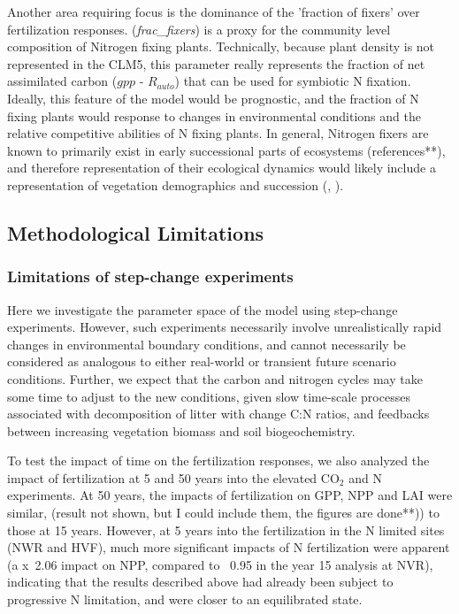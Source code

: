 \documentclass[draft,linenumbers]{agujournal}
\begin{document}
Another area requiring focus is the dominance of the 'fraction of fixers' over fertilization responses.  (\emph{frac\_fixers}) is a proxy for the community level composition of Nitrogen fixing plants. Technically, because plant density is not represented in the CLM5, this parameter really represents the fraction of net assimilated carbon ($gpp$ - $R_{auto}$) that can be used for symbiotic N fixation. Ideally, this feature of the model would be prognostic, and the fraction of N fixing plants would response to changes in environmental conditions and the relative competitive abilities of N fixing plants. In general, Nitrogen fixers are known to primarily exist in early successional parts of ecosystems (references**), and therefore representation of their ecological dynamics would likely include a representation of vegetation demographics and succession (\cite{fisher2018vegetation}, \cite{trugman2016climate}).

\subsection{ Methodological Limitations}
\subsubsection{Limitations of step-change experiments}
Here we investigate the parameter space of the model using step-change experiments. However, such experiments necessarily involve unrealistically rapid changes in environmental boundary conditions, and cannot necessarily be considered as analogous to either real-world or transient future scenario conditions. Further, we expect that the carbon and nitrogen cycles may take some time to adjust to the new conditions, given slow time-scale processes associated with decomposition of litter with change C:N ratios, and feedbacks between increasing vegetation biomass and soil biogeochemistry.

To test the impact of time on the fertilization responses, we also analyzed the impact of fertilization at 5 and 50 years into the elevated CO$_{2}$ and N experiments. At 50 years, the impacts of fertilization on GPP, NPP and LAI were similar, (result not shown, but I could include them, the figures are done**)) to those at 15 years.  However, at 5 years into the fertilization in the N limited sites (NWR and HVF), much more significant impacts of N fertilization were apparent (a x~2.06 impact on NPP, compared to ~0.95 in the year 15 analysis at NVR), indicating that the results described above had already been subject to progressive N limitation, and were closer to an equilibrated state.
\end{document}
